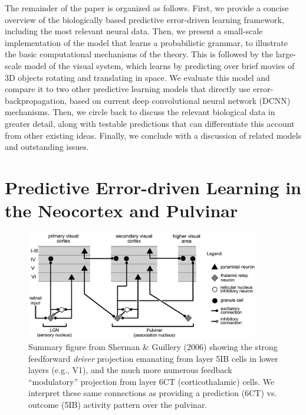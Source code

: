 \documentclass[11pt,twoside]{article}
\newif\myifpdf
\begin{document}
The remainder of the paper is organized as follows.  First, we provide a concise overview of the biologically based predictive error-driven learning framework, including the most relevant neural data.  Then, we present a small-scale implementation of the model that learns a probabilistic grammar, to illustrate the basic computational mechanisms of the theory.  This is followed by the large-scale model of the visual system, which learns by predicting over brief movies of 3D objects rotating and translating in space.  We evaluate this model and compare it to two other predictive learning models that directly use error-backpropagation, based on current deep convolutional neural network (DCNN) mechanisms.  Then, we circle back to discuss the relevant biological data in greater detail, along with testable predictions that can differentiate this account from other existing ideas.  Finally, we conclude with a discussion of related models and outstanding issues.

\section{Predictive Error-driven Learning in the Neocortex and Pulvinar}

\begin{figure}
  \centering\includegraphics[width=4in]{fig_sherman_guillery_summary}
  \caption{\footnotesize Summary figure from Sherman \& Guillery (2006) showing the strong feedforward \emph{driver} projection emanating from layer 5IB cells in lower layers (e.g., V1), and the much more numerous feedback ``modulatory'' projection from layer 6CT (corticothalamic) cells.  We interpret these same connections as providing a prediction (6CT) vs. outcome (5IB) activity pattern over the pulvinar.}
  \label{fig.sg06}
\end{figure}
\end{document}
